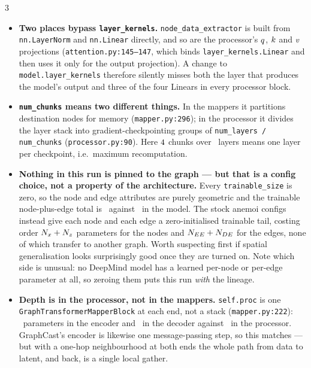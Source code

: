 \documentclass[11pt,landscape]{article}
\begin{document}
\begin{multicols}{3}
\begin{itemize}[leftmargin=1.1em]
    \item \textbf{Two places bypass \texttt{layer\_kernels}.}
      \texttt{node\_data\_extractor} is built from \texttt{nn.LayerNorm} and
      \texttt{nn.Linear} directly, and so are the processor's $q$, $k$
      and $v$ projections (\texttt{attention.py:145--147}, which binds
      \texttt{layer\_kernels.Linear} and then uses it only for the output
      projection).  A change to \texttt{model.layer\_kernels} therefore silently
      misses both the layer that produces the model's output and three of the four
      Linears in every processor block.

    \item \textbf{\texttt{num\_chunks} means two different things.}
      In the mappers it partitions destination nodes for memory
      (\texttt{mapper.py:296}); in the processor it divides the layer stack into
      gradient-checkpointing groups of \texttt{num\_layers / num\_chunks}
      (\texttt{processor.py:90}).  Here $4$ chunks over \valNL\ layers
      means one layer per checkpoint, i.e.\ maximum recomputation.

    \item \textbf{Nothing in this run is pinned to the graph --- but that is a
      config choice, not a property of the architecture.}
      Every \texttt{trainable\_size} is zero, so the node and edge attributes are
      purely geometric and the trainable node-plus-edge total is
      \valgraphparams\ against \valtotalparams\ in the model.  The stock anemoi
      configs instead give each node and each edge a zero-initialised trainable
      tail, costing order $N_{x}+N_{z}$ parameters for the nodes and $N_{EE}+N_{DE}$ for
      the edges, none of which transfer to another graph.  Worth suspecting first if spatial generalisation
      looks surprisingly good once they are turned on.  Note which side is unusual:
      no DeepMind model has a learned per-node or per-edge parameter at all, so
      zeroing them puts this run \emph{with} the lineage.

    \item \textbf{Depth is in the processor, not in the mappers.}
      \texttt{self.proc} is one \texttt{Graph\-Transformer\-Mapper\-Block} at
      each end, not a stack (\texttt{mapper.py:222}): \valencparams\ parameters
      in the encoder and \valdecparams\ in the decoder against \valprocparams\
      in the processor.  GraphCast's encoder is likewise one message-passing step,
      so this matches --- but with a one-hop neighbourhood at both ends the whole
      path from data to latent, and back, is a single local gather.


\end{itemize}
\end{multicols}
\end{document}
